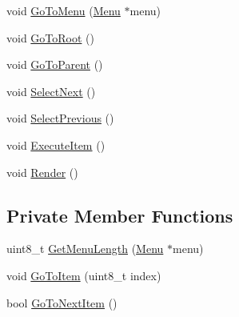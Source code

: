 \begin{DoxyCompactItemize}
\item 
void \hyperlink{class_menu_1_1_controller_a1df8e49520c77372d479903c3ec93341}{Go\-To\-Menu} (\hyperlink{struct_menu_1_1_menu}{Menu} $\ast$menu)
\item 
void \hyperlink{class_menu_1_1_controller_a787911ef46ca1968c2fd667af1f9ac27}{Go\-To\-Root} ()
\item 
void \hyperlink{class_menu_1_1_controller_ab30a038c4e4e3cb102d419c11a6813f6}{Go\-To\-Parent} ()
\item 
void \hyperlink{class_menu_1_1_controller_a9aabc6ba652c29efa7a02e12f51ce0b1}{Select\-Next} ()
\item 
void \hyperlink{class_menu_1_1_controller_a04e3448cfe4341ad7209a9f16bbcb449}{Select\-Previous} ()
\item 
void \hyperlink{class_menu_1_1_controller_a0dda40652b8802a8fe39c1ce61a66f1a}{Execute\-Item} ()
\item 
void \hyperlink{class_menu_1_1_controller_af46abb3d242c76822c0e8ea8ab777fa5}{Render} ()
\end{DoxyCompactItemize}
\subsection*{Private Member Functions}
\begin{DoxyCompactItemize}
\item 
uint8\-\_\-t \hyperlink{class_menu_1_1_controller_a24009cee76b147079041b2130a806027}{Get\-Menu\-Length} (\hyperlink{struct_menu_1_1_menu}{Menu} $\ast$menu)
\item 
void \hyperlink{class_menu_1_1_controller_afa4a1e26efe90dd5d9479bb8c84404b6}{Go\-To\-Item} (uint8\-\_\-t index)
\item 
bool \hyperlink{class_menu_1_1_controller_ad93989bb6a9ed55f67ad5c15e666cf39}{Go\-To\-Next\-Item} ()
\end{DoxyCompactItemize}
